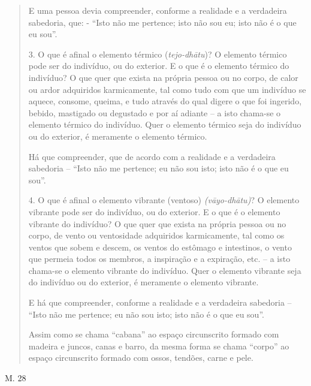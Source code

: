\begin{quote}
E uma pessoa devia compreender, conforme a realidade e a verdadeira sabedoria, que: - ``Isto não me pertence; isto não sou eu; isto não é o que eu sou''.

3. O que é afinal o elemento térmico (\emph{tejo-dhātu})? O elemento térmico pode ser do indivíduo, ou do exterior. E o que é o elemento térmico do indivíduo? O que quer que exista na própria pessoa ou no corpo, de calor ou ardor adquiridos karmicamente, tal como tudo com que um indivíduo se aquece, consome, queima, e tudo através do qual digere o que foi ingerido, bebido, mastigado ou degustado e por aí adiante -- a isto chama-se o elemento térmico do indivíduo. Quer o elemento térmico seja do indivíduo ou do exterior, é meramente o elemento térmico.

Há que compreender, que de acordo com a realidade e a verdadeira sabedoria -- ``Isto não me pertence; eu não sou isto; isto não é o que eu sou''.

4. O que é afinal o elemento vibrante (ventoso) \emph{(vāyo-dhātu)}? O elemento vibrante pode ser do indivíduo, ou do exterior. E o que é o elemento vibrante do indivíduo? O que quer que exista na própria pessoa ou no corpo, de vento ou ventosidade adquiridos karmicamente, tal como os ventos que sobem e descem, os ventos do estômago e intestinos, o vento que permeia todos os membros, a inspiração e a expiração, etc. -- a isto chama-se o elemento vibrante do indivíduo. Quer o elemento vibrante seja do indivíduo ou do exterior, é meramente o elemento vibrante.

E há que compreender, conforme a realidade e a verdadeira sabedoria -- ``Isto não me pertence; eu não sou isto; isto não é o que eu sou''.

Assim como se chama ``cabana'' ao espaço circunscrito formado com madeira e juncos, canas e barro, da mesma forma se chama ``corpo'' ao espaço circunscrito formado com ossos, tendões, carne e pele.
\end{quote}

M. 28

